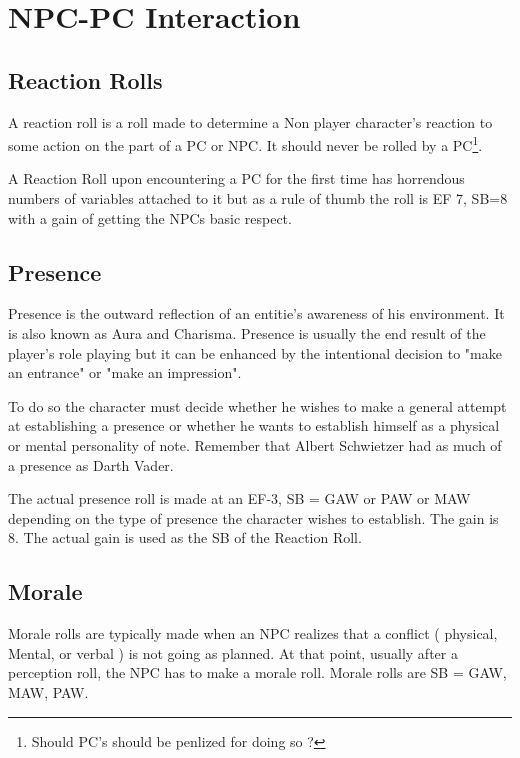 \chapter{NPC-PC Interaction}

\section{Reaction Rolls}

A reaction roll is a roll made to determine a Non player character's 
reaction to some action on the part of a PC or NPC. It should never 
be rolled by a PC\footnote{Should PC's should be penlized for doing so ?}.

A Reaction Roll upon encountering a PC for the first time has 
horrendous numbers of variables attached to it but as a rule of thumb 
the roll is EF 7, SB=8 with a gain of getting the NPCs basic respect.

\section{Presence}

Presence is the outward reflection of an entitie's awareness of his 
environment. It is also known as Aura and Charisma. Presence is 
usually the end result of the player's role playing but it can be 
enhanced by the intentional decision to "make an entrance" or "make an 
impression".

To do so the character must decide whether he wishes to make a
general attempt at establishing a presence or whether he wants to 
establish himself as a physical or mental personality of note.
Remember that Albert Schwietzer had as much of a presence as Darth
Vader.

The actual presence roll is made at an EF-3, SB = GAW or PAW or MAW 
depending on the type of presence the character wishes to establish. 
The gain is 8. The actual gain is used as the SB of the Reaction 
Roll. 

\section{Morale}

Morale rolls are typically made when an NPC realizes that a conflict 
( physical, Mental, or verbal ) is not going as planned. At that point,
usually after a perception roll, the NPC has to make a morale roll. 
Morale rolls are SB = GAW, MAW, PAW.



